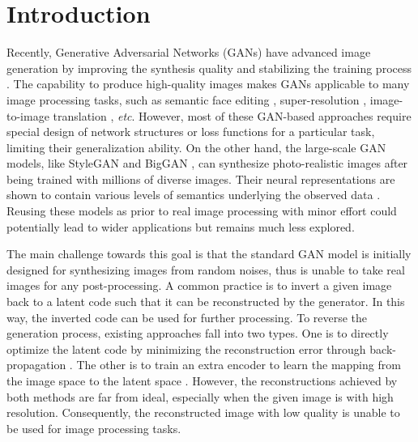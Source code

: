 \documentclass[10pt,twocolumn,letterpaper]{article}
\begin{document}
\vspace{-12pt}
\section{Introduction}\label{sec:introduction}
Recently, Generative Adversarial Networks (GANs) \cite{gan} have advanced image generation by improving the synthesis quality \cite{pggan,biggan,stylegan} and stabilizing the training process \cite{wgan,began,wgangp}.
The capability to produce high-quality images makes GANs applicable to many image processing tasks, such as semantic face editing \cite{lample2017fader,shen2018faceid}, super-resolution \cite{ledig2017photo,wang2018esrgan}, image-to-image translation \cite{zhu2017unpaired,stargan,liu2019few}, \emph{etc}.
However, most of these GAN-based approaches require special design of network structures \cite{lample2017fader,zhu2017unpaired} or loss functions \cite{shen2018faceid,ledig2017photo} for a particular task, limiting their generalization ability.
On the other hand, the large-scale GAN models, like StyleGAN \cite{stylegan} and BigGAN \cite{biggan}, can synthesize photo-realistic images after being trained with millions of diverse images.
Their neural representations are shown to contain various levels of semantics underlying the observed data \cite{jahanian2020steerability,goetschalckx2019ganalyze,shen2020interpreting,yang2019semantic}.
Reusing these models as prior to real image processing with minor effort could potentially lead to wider applications but remains much less explored.


The main challenge towards this goal is that the standard GAN model is initially designed for synthesizing images from random noises, thus is unable to take real images for any post-processing.
A common practice is to invert a given image back to a latent code such that it can be reconstructed by the generator.
In this way, the inverted code can be used for further processing.
To reverse the generation process, existing approaches fall into two types.
One is to directly optimize the latent code by minimizing the reconstruction error through back-propagation \cite{lipton2017precise,inverting2018,invertibility}.
The other is to train an extra encoder to learn the mapping from the image space to the latent space \cite{inverting2016,zhu2016generative,bau2019seeing,inverting2019}.
However, the reconstructions achieved by both methods are far from ideal, especially when the given image is with high resolution.
Consequently, the reconstructed image with low quality is unable to be used for image processing tasks.
\end{document}
